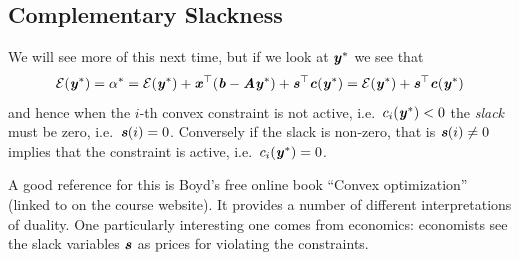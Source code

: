 \subsection{Complementary Slackness}

We will see more of this next time, but if we look at $\yy^*$ we see that
\begin{equation*}\energy(\yy^*) =  \alpha^* = \energy(\yy^*) + \xx^{\trp}(\bb - \AA\yy^*) + \ss^{\trp}\cc(\yy^*) = \energy(\yy^*) + \ss^{\trp}\cc(\yy^*) \end{equation*}
and hence when the $i$-th convex constraint is not active, i.e.\ $c_i(\yy^*) < 0$ the \emph{slack} must be zero, i.e.\ $\ss(i) = 0$.
Conversely if the slack is non-zero, that is $\ss(i) \neq 0$ implies that the constraint is active, i.e.\ $c_i(\yy^*) = 0$.

A good reference for this is Boyd's free online book ``Convex
optimization'' (linked to on the course website).
It provides a number of different interpretations of duality. One
particularly interesting one comes from economics:
economists see the slack variables $\ss$ as prices for violating the constraints.

%
